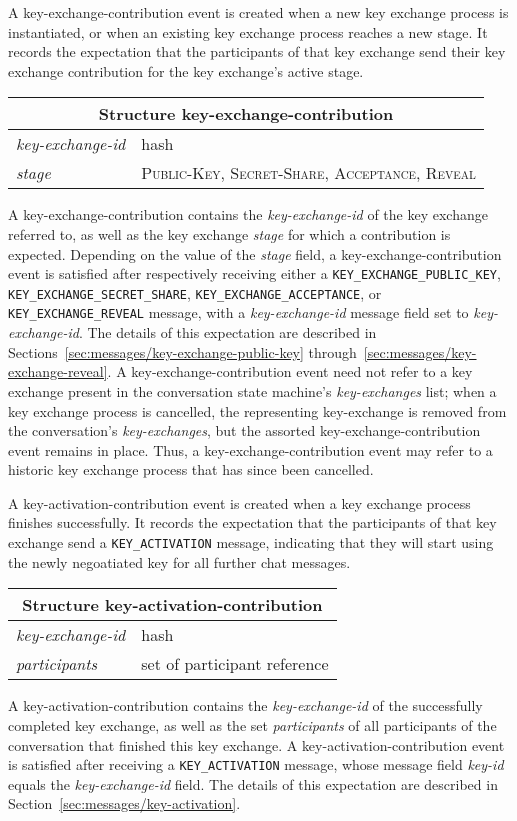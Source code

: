 \documentclass{article}
\def\npmessage#1{\texttt{#1}}
\def\field#1{\textit{#1}}
\def\smfield#1{\textsl{#1}}
\def\type#1{\textsf{#1}}
\newenvironment{struct}[1]{
\newcommand{\structfield}[2]{
\smfield{##1} & \type{##2} \\
\hline
}
\par
\vspace{-\medskipamount}
\hspace{2em minus 2em}\begin{tabular}{|l|l|}
\hline
\multicolumn{2}{|c|}{Structure \type{#1}} \\
\hline
\hline
}{
\end{tabular}
\vspace{-\medskipamount}
\par
}
\begin{document}
A \type{key-exchange-contribution} event is created when a new key exchange process is instantiated, or when an existing key exchange process reaches a new stage.
It records the expectation that the participants of that key exchange send their key exchange contribution for the key exchange's active stage.
\begin{struct}{key-exchange-contribution}
\structfield{key-exchange-id}{hash}
\structfield{stage}{\normalfont \textsc{Public-Key}, \textsc{Secret-Share}, \textsc{Acceptance}, \textsc{Reveal}}
\end{struct}
A \type{key-exchange-contribution} contains the \smfield{key-exchange-id} of the key exchange referred to, as well as the key exchange \smfield{stage} for which a contribution is expected.
Depending on the value of the \smfield{stage} field, a \type{key-exchange-contribution} event is satisfied after respectively receiving either a \npmessage{KEY\_EXCHANGE\_PUBLIC\_KEY}, \npmessage{KEY\_EXCHANGE\_SECRET\_SHARE}, \npmessage{KEY\_EXCHANGE\_ACCEPTANCE}, or \npmessage{KEY\_EXCHANGE\_REVEAL} message, with a \field{key-exchange-id} message field set to \smfield{key-exchange-id}.
The details of this expectation are described in Sections~\ref{sec:messages/key-exchange-public-key} through~\ref{sec:messages/key-exchange-reveal}.
A \type{key-exchange-contribution} event need not refer to a key exchange present in the conversation state machine's \smfield{key-exchanges} list; when a key exchange process is cancelled, the representing \type{key-exchange} is removed from the conversation's \smfield{key-exchanges}, but the assorted \type{key-exchange-contribution} event remains in place.
Thus, a \type{key-exchange-contribution} event may refer to a historic key exchange process that has since been cancelled.

A \type{key-activation-contribution} event is created when a key exchange process finishes successfully.
It records the expectation that the participants of that key exchange send a \npmessage{KEY\_ACTIVATION} message, indicating that they will start using the newly negoatiated key for all further chat messages.
\begin{struct}{key-activation-contribution}
\structfield{key-exchange-id}{hash}
\structfield{participants}{set of participant reference}
\end{struct}
A \type{key-activation-contribution} contains the \smfield{key-exchange-id} of the successfully completed key exchange, as well as the set \smfield{participants} of all participants of the conversation that finished this key exchange.
A \type{key-activation-contribution} event is satisfied after receiving a \npmessage{KEY\_ACTIVATION} message, whose message field \field{key-id} equals the \smfield{key-exchange-id} field.
The details of this expectation are described in Section~\ref{sec:messages/key-activation}.
\end{document}

